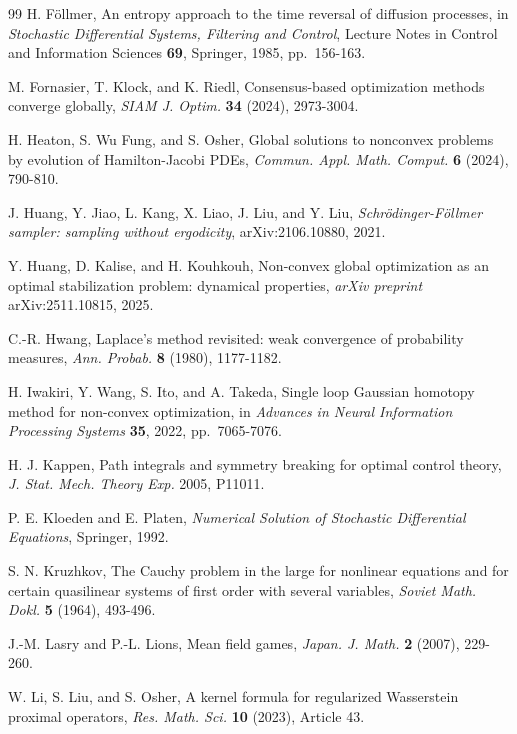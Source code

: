 \documentclass[11pt]{amsart}
\numberwithin{equation}{section}
\numberwithin{figure}{section}
\theoremstyle{definition}\newtheorem{remark}[theorem]{Remark}%
\begin{document}
\begin{thebibliography}{99}
H. F\"ollmer,
An entropy approach to the time reversal of diffusion processes,
in \emph{Stochastic Differential Systems, Filtering and Control},
Lecture Notes in Control and Information Sciences \textbf{69},
Springer, 1985, pp.~156-163.

M. Fornasier, T. Klock, and K. Riedl,
Consensus-based optimization methods converge globally,
\emph{SIAM J. Optim.} \textbf{34} (2024), 2973-3004.

H. Heaton, S. Wu Fung, and S. Osher,
Global solutions to nonconvex problems by evolution of Hamilton-Jacobi PDEs,
\emph{Commun. Appl. Math. Comput.} \textbf{6} (2024), 790-810.

J. Huang, Y. Jiao, L. Kang, X. Liao, J. Liu, and Y. Liu,
\emph{Schr\"odinger-F\"ollmer sampler: sampling without ergodicity},
arXiv:2106.10880, 2021.

Y. Huang, D. Kalise, and H. Kouhkouh,
Non-convex global optimization as an optimal stabilization problem: dynamical properties,
\emph{arXiv preprint} arXiv:2511.10815, 2025.

C.-R. Hwang,
Laplace's method revisited: weak convergence of probability measures,
\emph{Ann. Probab.} \textbf{8} (1980), 1177-1182.

H. Iwakiri, Y. Wang, S. Ito, and A. Takeda,
Single loop Gaussian homotopy method for non-convex optimization,
in \emph{Advances in Neural Information Processing Systems} \textbf{35},
2022, pp.~7065-7076.

H. J. Kappen,
Path integrals and symmetry breaking for optimal control theory,
\emph{J. Stat. Mech. Theory Exp.} 2005, P11011.

P. E. Kloeden and E. Platen,
\emph{Numerical Solution of Stochastic Differential Equations},
Springer, 1992.

S. N. Kruzhkov,
The Cauchy problem in the large for nonlinear equations and for certain quasilinear systems of first order with several variables,
\emph{Soviet Math. Dokl.} \textbf{5} (1964), 493-496.
 
J.-M. Lasry and P.-L. Lions,
Mean field games,
\emph{Japan. J. Math.} \textbf{2} (2007), 229-260.

W. Li, S. Liu, and S. Osher,
A kernel formula for regularized Wasserstein proximal operators,
\emph{Res. Math. Sci.} \textbf{10} (2023), Article 43.


\end{thebibliography}
\end{document}
